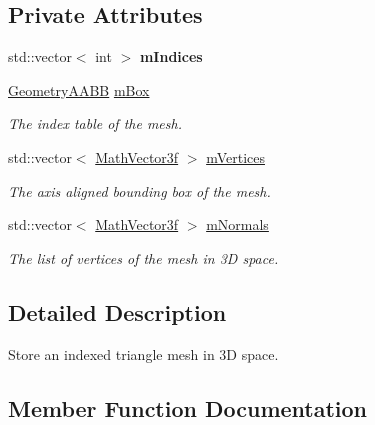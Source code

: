 \subsection*{Private Attributes}
\begin{DoxyCompactItemize}
\item 
\mbox{\label{classvisilib_1_1_helper_triangle_mesh_abbf3556700865e8e84c43f9d3bc4ab06}} 
std\+::vector$<$ int $>$ {\bfseries m\+Indices}
\item 
\mbox{\hyperlink{classvisilib_1_1_geometry_a_a_b_b}{Geometry\+A\+A\+BB}} \mbox{\hyperlink{classvisilib_1_1_helper_triangle_mesh_a6e648db3f9ca746b4a0f5ebd67113662}{m\+Box}}
\begin{DoxyCompactList}\small\item\em The index table of the mesh. \end{DoxyCompactList}\item 
std\+::vector$<$ \mbox{\hyperlink{classvisilib_1_1_math_vector3__}{Math\+Vector3f}} $>$ \mbox{\hyperlink{classvisilib_1_1_helper_triangle_mesh_a90a6fc1de5c582c0bf0ab0002459ff56}{m\+Vertices}}
\begin{DoxyCompactList}\small\item\em The axis aligned bounding box of the mesh. \end{DoxyCompactList}\item 
std\+::vector$<$ \mbox{\hyperlink{classvisilib_1_1_math_vector3__}{Math\+Vector3f}} $>$ \mbox{\hyperlink{classvisilib_1_1_helper_triangle_mesh_aceac95ff741e999a29dc8eae52735c70}{m\+Normals}}
\begin{DoxyCompactList}\small\item\em The list of vertices of the mesh in 3D space. \end{DoxyCompactList}\end{DoxyCompactItemize}


\subsection{Detailed Description}
Store an indexed triangle mesh in 3D space. 

\subsection{Member Function Documentation}
\mbox{\label{classvisilib_1_1_helper_triangle_mesh_a8e1d36896b60a29eded64c1cc28c00cc}} 
